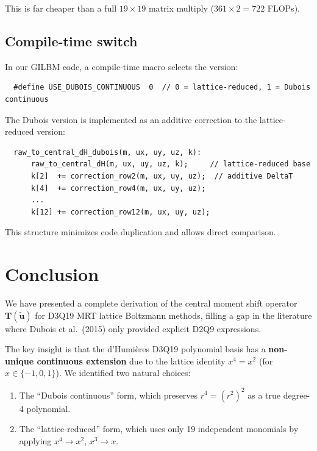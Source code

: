 \documentclass[11pt,a4paper]{article}
\newcommand{\vect}[1]{\bm{#1}}
\newcommand{\mat}[1]{\bm{#1}}
\newcommand{\Tmat}{\mat{T}}
\begin{document}
This is far cheaper than a full $19\times 19$ matrix multiply ($361 \times 2 = 722$ FLOPs).

\subsection{Compile-time switch}

In our GILBM code, a compile-time macro selects the version:
\begin{verbatim}
  #define USE_DUBOIS_CONTINUOUS  0  // 0 = lattice-reduced, 1 = Dubois continuous
\end{verbatim}

The Dubois version is implemented as an additive correction to the lattice-reduced version:
\begin{verbatim}
  raw_to_central_dH_dubois(m, ux, uy, uz, k):
      raw_to_central_dH(m, ux, uy, uz, k);     // lattice-reduced base
      k[2]  += correction_row2(m, ux, uy, uz);  // additive DeltaT
      k[4]  += correction_row4(m, ux, uy, uz);
      ...
      k[12] += correction_row12(m, ux, uy, uz);
\end{verbatim}

This structure minimizes code duplication and allows direct comparison.

\section{Conclusion}

We have presented a complete derivation of the central moment shift operator $\Tmat(\tilde{\vect{u}})$ for D3Q19 MRT lattice Boltzmann methods, filling a gap in the literature where Dubois et al.\ (2015) only provided explicit D2Q9 expressions.

The key insight is that the d'Humi\`eres D3Q19 polynomial basis has a \textbf{non-unique continuous extension} due to the lattice identity $x^4 = x^2$ (for $x \in \{-1,0,1\}$).
We identified two natural choices:
\begin{enumerate}[nosep]
  \item The ``Dubois continuous'' form, which preserves $r^4 = (r^2)^2$ as a true degree-4 polynomial.
  \item The ``lattice-reduced'' form, which uses only 19 independent monomials by applying $x^4 \to x^2$, $x^3 \to x$.
\end{enumerate}
\end{document}
